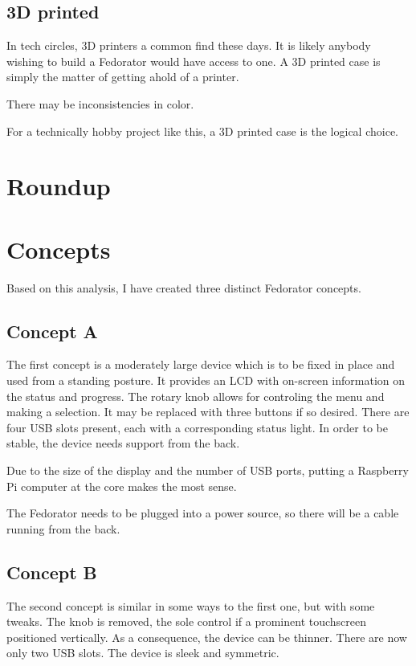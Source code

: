         \subsection{3D printed}
            In tech circles, 3D printers a common find these days.  It is likely anybody wishing to build a Fedorator would have access to one.  A 3D printed case is simply the matter of getting ahold of a printer.
            
            There may be inconsistencies in color.  
            
            For a technically hobby project like this, a 3D printed case is the logical choice.
    \section{Roundup}
        \blind[2]
    \section{Concepts}
        Based on this analysis, I have created three distinct Fedorator concepts.
        \subsection{Concept A}
            The first concept is a moderately large device which is to be fixed in place and used from a standing posture.  It provides an LCD with on-screen information on the status and progress.  The rotary knob allows for controling the menu and making a selection.  It may be replaced with three buttons if so desired.  There are four USB slots present, each with a corresponding status light.  In order to be stable, the device needs support from the back.
            
            Due to the size of the display and the number of USB ports, putting a Raspberry Pi computer at the core makes the most sense.
            
            The Fedorator needs to be plugged into a power source, so there will be a cable running from the back.
        \subsection{Concept B}
            The second concept is similar in some ways to the first one, but with some tweaks.  The knob is removed, the sole control if a prominent touchscreen positioned vertically.  As a consequence, the device can be thinner.  There are now only two USB slots.  The device is sleek and symmetric.
            
